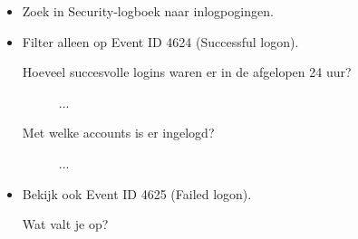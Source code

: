 \begin{itemize}
\item Zoek in Security-logboek naar inlogpogingen.
\item Filter alleen op Event ID 4624 (Successful logon).
	\begin{description}
	\item[Hoeveel succesvolle logins waren er in de afgelopen 24 uur?] ... \newline \newline
	\item[Met welke accounts is er ingelogd?] ... \newline \newline
	\end{description}
\item Bekijk ook Event ID 4625 (Failed logon).
	\begin{description}
	\item[Wat valt je op?]
	\end{description}
\end{itemize}

